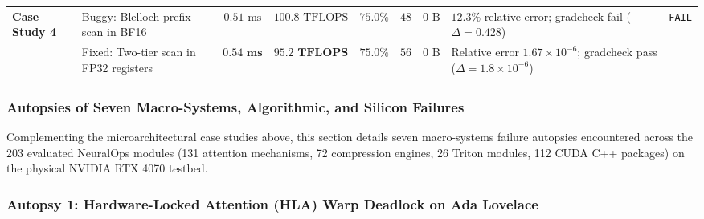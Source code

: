 \begin{table}[t]
{\begin{tabular}{@{} l l c c c c c l c @{}}
\midrule
\multirow{2}{*}{\textbf{Case Study 4}} & Buggy: Blelloch prefix scan in BF16 & $0.51\text{ ms}$ & $100.8\text{ TFLOPS}$ & $75.0\%$ & $48$ & $0\text{ B}$ & $12.3\%$ relative error; gradcheck fail ($\Delta = 0.428$) & \texttt{FAIL} \\
& Fixed: Two-tier scan in FP32 registers & $\mathbf{0.54\text{ ms}}$ & $\mathbf{95.2\text{ TFLOPS}}$ & $75.0\%$ & $56$ & $0\text{ B}$ & Relative error $1.67 \times 10^{-6}$; gradcheck pass ($\Delta = 1.8 \times 10^{-6}$) & \passfast{} \\
\bottomrule
\end{tabular}
}
\end{table}

\subsubsection{Autopsies of Seven Macro-Systems, Algorithmic, and Silicon Failures}
\label{sec:macro_systems_autopsies}

Complementing the microarchitectural case studies above, this section details seven macro-systems failure autopsies encountered across the 203 evaluated NeuralOps modules (131 attention mechanisms, 72 compression engines, 26 Triton modules, 112 CUDA C++ packages) on the physical NVIDIA RTX 4070 testbed.

\subsubsection{Autopsy 1: Hardware-Locked Attention (HLA) Warp Deadlock on Ada Lovelace}
\label{sec:autopsy_hla_deadlock}

